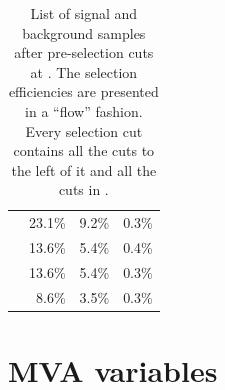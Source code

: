 \begin{table}[!tbp]
\begin{tabular}{lrrr}
\hline
\gammagamma{\Pphoton}{\BS}{\Pphoton}{\BS}{ \Pquark \Pquark \Pquark \Pquark}& 23.1\% & 9.2\%  & 0.3\%\\
\gammagamma{\Pphoton}{\BS}{\Pphoton}{\EPA}{ \Pquark \Pquark \Pquark \Pquark}& 13.6\% & 5.4\%  &0.4\%\\
\gammagamma{\Pphoton}{\EPA}{\Pphoton}{\BS}{ \Pquark \Pquark \Pquark \Pquark}& 13.6\% & 5.4\% & 0.3\%\\
\gammagamma{\Pphoton}{\EPA}{\Pphoton}{\EPA}{ \Pquark \Pquark \Pquark \Pquark}& 8.6\% & 3.5\% & 0.3\% \\
\hline \hline
\end{tabular}
\caption[List of signal and background samples after pre-selection cuts at .]
{List of signal and background samples after pre-selection cuts at .  The selection efficiencies are presented in a ``flow'' fashion. Every selection cut contains all the cuts to the left of it and all the cuts in  .}
\label{tab:doubleHiggsPreslectionPart2}
\end{table}

\section{MVA variables}

